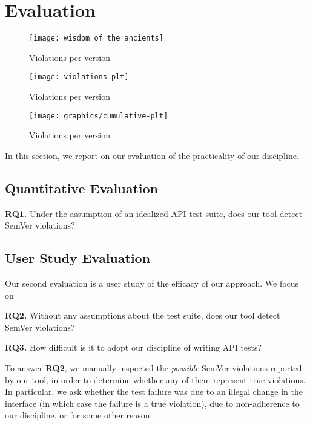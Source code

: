 \section{Evaluation}

\begin{figure}
\centering
\texttt{[image: wisdom\_of\_the\_ancients]}
\caption{Violations per version}
\end{figure}

\begin{figure*}
\centering
\texttt{[image: violations-plt]}
\caption{Violations per version}
\end{figure*}

\begin{figure*}
\centering
\texttt{[image: graphics/cumulative-plt]}
\caption{Violations per version}
\end{figure*}



In this section, we report on our evaluation of the practicality of
our discipline. 

\subsection{Quantitative Evaluation}

{\bf RQ1.} Under the assumption of an idealized API test suite, does
our tool detect SemVer violations?

\subsection{User Study Evaluation}
Our second evaluation is a user study of the efficacy of our
approach. We focus on 

{\bf RQ2.} Without any assumptions about the test suite, does our tool
detect SemVer violations?

{\bf RQ3.} How difficult is it to adopt our discipline of writing API
tests?

To answer {\bf RQ2}, we manually inspected the {\em possible\/} SemVer
violations reported by our tool, in order to determine whether any of
them represent true violations. In particular, we ask whether the test
failure was due to an illegal change in the interface (in which case
the failure is a true violation), due to non-adherence to our
discipline, or for some other reason.

